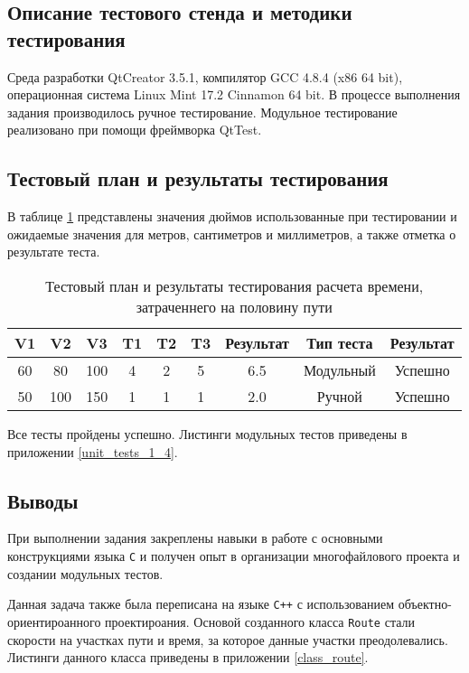 \documentclass[12pt,a4paper]{report}
\begin{document}
\subsection{Описание тестового стенда и методики тестирования}
\hspace{\parindent}Среда разработки QtCreator 3.5.1, компилятор GCC 4.8.4 (x86 64 bit), операционная система Linux Mint 17.2 Cinnamon 64 bit.
В процессе выполнения задания производилось ручное тестирование.
Модульное тестирование реализовано при помощи фреймворка QtTest.

\subsection{Тестовый план и результаты тестирования}
\hspace{\parindent}В таблице \ref{time_test_plan} представлены значения дюймов использованные при тестировании и ожидаемые значения для метров, сантиметров и миллиметров, а также отметка о результате теста.
\FloatBarrier
\begin{table}[h]
\caption{Тестовый план и результаты тестирования расчета времени, затраченнего на половину пути}
\label{time_test_plan}
\begin{tabular}{| c c c | c c c | c | c | c |}
\hline 
V1 & V2 & V3 & T1 & T2 & T3 & Результат & Тип теста & Результат \\ 
\hline 
60 & 80 & 100 & 4 & 2 & 5 & 6.5 & Модульный & Успешно \\ 
\hline 
50 & 100 & 150 & 1 & 1 & 1 & 2.0 & Ручной & Успешно \\ 
\hline 
\end{tabular} 
\end{table}
\FloatBarrier
Все тесты пройдены успешно. Листинги модульных тестов приведены в приложении \ref{unit_tests_1_4}.
\subsection{Выводы}
\hspace{\parindent}При выполнении задания закреплены навыки в работе с основными конструкциями языка \verb+C+ и получен опыт в организации многофайлового проекта и создании модульных тестов.

Данная задача также была переписана на языке \verb|C++| с использованием объектно-ориентироанного проектироания. Основой созданного класса \verb+Route+ стали скорости на участках пути и время, за которое данные участки преодолевались. Листинги данного класса приведены в приложении \ref{class_route}.
\newpage
\end{document}
